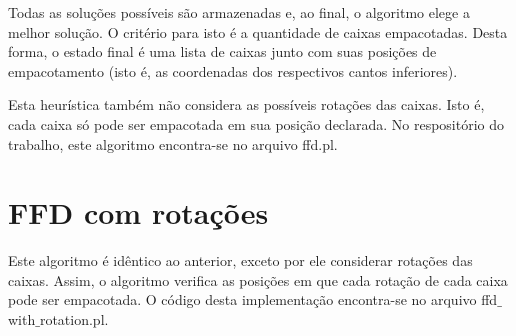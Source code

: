 \documentclass[12pt]{article}
\begin{document}
Todas as soluções possíveis são armazenadas e, ao final, o algoritmo elege a melhor solução. O critério para isto é a quantidade de caixas empacotadas. Desta forma, o estado final é uma lista de caixas junto com suas posições de empacotamento (isto é, as coordenadas dos respectivos cantos inferiores).
 
Esta heurística também não considera as possíveis rotações das caixas. Isto é, cada caixa só pode ser empacotada em sua posição declarada. No respositório do trabalho, este algoritmo encontra-se no arquivo ffd.pl. 


\section{FFD com rotações}

Este algoritmo é idêntico ao anterior, exceto por ele considerar rotações das caixas. Assim, o algoritmo verifica as posições em que cada rotação de cada caixa pode ser empacotada. O código desta implementação encontra-se no arquivo ffd$\_$with$\_$rotation.pl.
\end{document}
